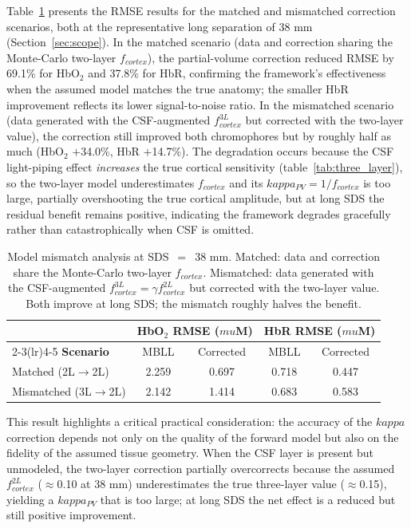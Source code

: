 \documentclass[11pt]{article}
\def\kappa{kappa}%
\def\mu{mu}%
\def\mathrm#1{#1}%
\def\,{ }%
\begin{document}
Table~\ref{tab:mismatch} presents the RMSE results for the matched and mismatched correction scenarios, both at the representative long separation of 38\,mm (Section~\ref{sec:scope}). In the matched scenario (data and correction sharing the Monte-Carlo two-layer $f_{\mathrm{cortex}}$), the partial-volume correction reduced RMSE by 69.1\% for HbO$_2$ and 37.8\% for HbR, confirming the framework's effectiveness when the assumed model matches the true anatomy; the smaller HbR improvement reflects its lower signal-to-noise ratio. In the mismatched scenario (data generated with the CSF-augmented $f_{\mathrm{cortex}}^{\mathrm{3L}}$ but corrected with the two-layer value), the correction still improved both chromophores but by roughly half as much (HbO$_2$ $+$34.0\%, HbR $+$14.7\%). The degradation occurs because the CSF light-piping effect \textit{increases} the true cortical sensitivity (table~\ref{tab:three_layer}), so the two-layer model underestimates $f_{\mathrm{cortex}}$ and its $\kappa_{\mathrm{PV}} = 1/f_{\mathrm{cortex}}$ is too large, partially overshooting the true cortical amplitude, but at long SDS the residual benefit remains positive, indicating the framework degrades gracefully rather than catastrophically when CSF is omitted.

\begin{table}[ht]
\centering
\caption{Model mismatch analysis at SDS~$=$~38\,mm. Matched: data and correction share the Monte-Carlo two-layer $f_{\mathrm{cortex}}$. Mismatched: data generated with the CSF-augmented $f_{\mathrm{cortex}}^{\mathrm{3L}}=\gamma f_{\mathrm{cortex}}^{\mathrm{2L}}$ but corrected with the two-layer value. Both improve at long SDS; the mismatch roughly halves the benefit.}
\label{tab:mismatch}
\begin{tabular}{@{}lcccc@{}}
\toprule
& \multicolumn{2}{c}{\textbf{HbO$_2$ RMSE ($\mu$M)}} & \multicolumn{2}{c}{\textbf{HbR RMSE ($\mu$M)}} \\
\cmidrule(lr){2-3}\cmidrule(lr){4-5}
\textbf{Scenario} & MBLL & Corrected & MBLL & Corrected \\
\midrule
Matched (2L$\rightarrow$2L) & 2.259 & 0.697 & 0.718 & 0.447 \\
Mismatched (3L$\rightarrow$2L) & 2.142 & 1.414 & 0.683 & 0.583 \\
\bottomrule
\end{tabular}
\end{table}

This result highlights a critical practical consideration: the accuracy of the $\kappa$ correction depends not only on the quality of the forward model but also on the fidelity of the assumed tissue geometry. When the CSF layer is present but unmodeled, the two-layer correction partially overcorrects because the assumed $f_{\mathrm{cortex}}^{\mathrm{2L}}$ ($\approx$0.10 at 38\,mm) underestimates the true three-layer value ($\approx$0.15), yielding a $\kappa_{\mathrm{PV}}$ that is too large; at long SDS the net effect is a reduced but still positive improvement.
\end{document}
